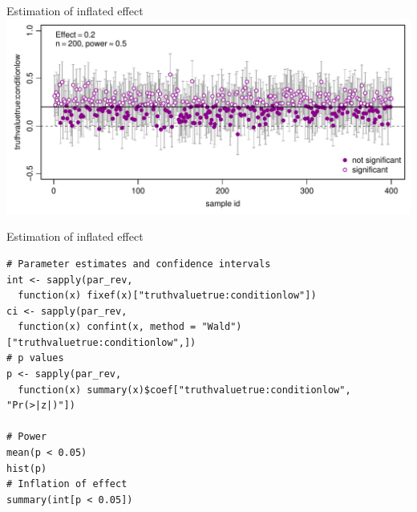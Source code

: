 \documentclass[aspectratio=169]{beamer}
\begin{document}
\begin{frame}{Estimation of inflated effect}
  \includegraphics[scale = .8]{../figures/inflation}
\end{frame}

{

\begin{frame}[fragile]{Estimation of inflated effect}
\begin{lstlisting}
# Parameter estimates and confidence intervals
int <- sapply(par_rev, 
  function(x) fixef(x)["truthvaluetrue:conditionlow"])
ci <- sapply(par_rev, 
  function(x) confint(x, method = "Wald")["truthvaluetrue:conditionlow",])
# p values
p <- sapply(par_rev, 
  function(x) summary(x)$coef["truthvaluetrue:conditionlow", "Pr(>|z|)"])

# Power
mean(p < 0.05)
hist(p)
# Inflation of effect
summary(int[p < 0.05])
\end{lstlisting}
\end{frame}

}
\end{document}

